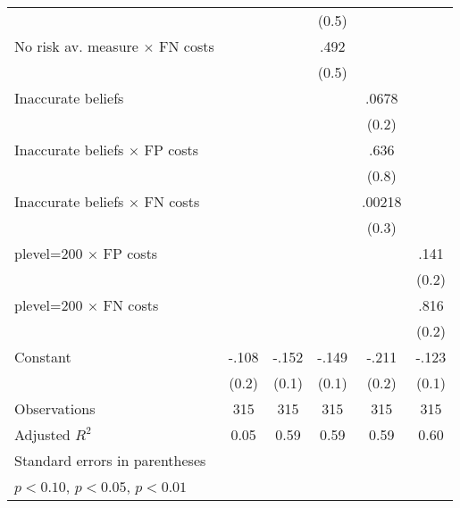 \begin{table}[htbp]
\begin{tabular}{l*{5}{c}}
                &                  &                  &    (0.5)         &                  &                  \\
No risk av. measure $\times$ FN costs&                  &                  &     .492         &                  &                  \\
                &                  &                  &    (0.5)         &                  &                  \\
Inaccurate beliefs&                  &                  &                  &    .0678         &                  \\
                &                  &                  &                  &    (0.2)         &                  \\
Inaccurate beliefs $\times$ FP costs&                  &                  &                  &     .636         &                  \\
                &                  &                  &                  &    (0.8)         &                  \\
Inaccurate beliefs $\times$ FN costs&                  &                  &                  &   .00218         &                  \\
                &                  &                  &                  &    (0.3)         &                  \\
plevel=200 $\times$ FP costs&                  &                  &                  &                  &     .141         \\
                &                  &                  &                  &                  &    (0.2)         \\
plevel=200 $\times$ FN costs&                  &                  &                  &                  &     .816\sym{***}\\
                &                  &                  &                  &                  &    (0.2)         \\
Constant        &    -.108         &    -.152\sym{*}  &    -.149\sym{*}  &    -.211         &    -.123         \\
                &    (0.2)         &    (0.1)         &    (0.1)         &    (0.2)         &    (0.1)         \\
\hline
Observations    &      315         &      315         &      315         &      315         &      315         \\
Adjusted \(R^{2}\)&     0.05         &     0.59         &     0.59         &     0.59         &     0.60         \\
\hline\hline
\multicolumn{6}{l}{\footnotesize Standard errors in parentheses}\\
\multicolumn{6}{l}{\footnotesize \sym{*} \(p<0.10\), \sym{**} \(p<0.05\), \sym{***} \(p<0.01\)}\\
\end{tabular}
\end{table}
